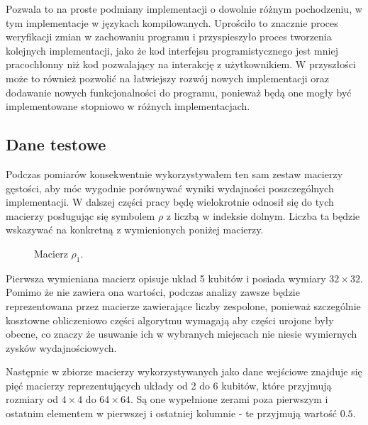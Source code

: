 \documentclass[11pt, a4paper]{article}
\begin{document}
\begin{sloppypar}
    Pozwala to na proste podmiany implementacji o dowolnie różnym pochodzeniu, w tym
    implementacje w językach kompilowanych. Uprościło to znacznie proces weryfikacji zmian
    w zachowaniu programu i przyspieszyło proces tworzenia kolejnych implementacji, jako
    że kod interfejsu programistycznego jest mniej pracochłonny niż kod pozwalający na
    interakcję z użytkownikiem. W przyszłości może to również pozwolić na łatwiejszy rozwój
    nowych implementacji oraz dodawanie nowych funkcjonalności do programu, ponieważ
    będą one mogły być implementowane stopniowo w różnych implementacjach.

    \subsection{Dane testowe}
    Podczas pomiarów konsekwentnie wykorzystywałem ten sam zestaw macierzy gęstości, aby
    móc wygodnie porównywać wyniki wydajności poszczególnych implementacji. W dalszej
    części pracy będę wielokrotnie odnosił się do tych macierzy posługując się symbolem
    $\rho$ z liczbą w indeksie dolnym. Liczba ta będzie wskazywać na konkretną z wymienionych
    poniżej macierzy.

    \FloatBarrier
    \begin{figure}[ht]
      \centering
      \setcounter{MaxMatrixCols}{33}
      
      \caption{Macierz $\rho_{1}$.}
      \label{rho-1}
    \end{figure}

    \FloatBarrier

    Pierwsza wymieniana macierz opisuje układ 5 kubitów i posiada wymiary $32\times32$.
    Pomimo że nie zawiera ona wartości, podczas analizy zawsze będzie reprezentowana przez
    macierze zawierające liczby zespolone, ponieważ szczególnie kosztowne obliczeniowo
    części algorytmu wymagają aby części urojone były obecne, co znaczy że usuwanie ich w
    wybranych miejscach nie niesie wymiernych zysków wydajnościowych.

    Następnie w zbiorze macierzy wykorzystywanych jako dane wejściowe znajduje się pięć macierzy
    reprezentujących układy od 2 do 6 kubitów, które przyjmują rozmiary od $4\times 4$
    do $64\times64$. Są one wypełnione zerami poza pierwszym i ostatnim elementem w pierwszej
    i ostatniej kolumnie - te przyjmują wartość $0.5$.


\end{sloppypar}
\end{document}
